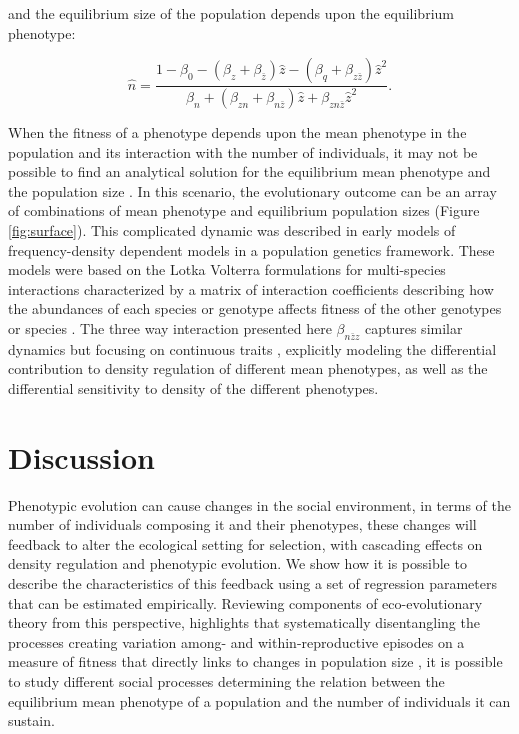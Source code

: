 \documentclass{article}
\begin{document}
\noindent and the equilibrium size of the population depends upon the equilibrium phenotype:

\begin{equation}  \label{eq: full}
	\hat{n} = \frac{1-\beta_{0}-(\beta_{z}  +  \beta_{\bar{z}})\hat{z} - (\beta_{q} + \beta_{z\bar{z}})\hat{z}^2 }{\beta_{n} + (\beta_{zn} + \beta_{n\bar{z}}) \hat{z} + \beta_{zn\bar{z}}\hat{z}^2}.
\end{equation}

When the fitness of a phenotype depends upon the mean phenotype in the population and its interaction with the number of individuals, it may not be possible to find an analytical solution for the equilibrium mean phenotype and the population size \citep{Engen2020}. In this scenario, the evolutionary outcome can be an array of combinations of mean phenotype and equilibrium population sizes (Figure \ref{fig:surface}). This complicated dynamic was described in early models of frequency-density dependent models in a population genetics framework. These models were based on the Lotka Volterra formulations for multi-species interactions characterized by a matrix of interaction coefficients describing how the abundances of each species or genotype affects fitness of the other genotypes or species \citep{Clarke1972, Anderson1983}. The three way interaction presented here $\beta_{n\bar{z}z}$ captures similar dynamics but focusing on continuous traits \citep{Engen2020}, explicitly modeling the differential contribution to density regulation of different mean phenotypes, as well as the differential sensitivity to density of the different phenotypes.   

\section{Discussion}
Phenotypic evolution can cause changes in the social environment, in terms of the number of individuals composing it and their phenotypes, these changes will feedback to alter the ecological setting for selection, with cascading effects on density regulation and phenotypic evolution. We show how it is possible to describe the characteristics of this feedback using a set of regression parameters that can be estimated empirically. Reviewing components of eco-evolutionary theory from this perspective, highlights that systematically disentangling the processes creating variation among- and within-reproductive episodes on a measure of fitness that directly links to changes in population size \citep{Saether2015}, it is possible to study different social processes determining the relation between the equilibrium mean phenotype of a population and the number of individuals it can sustain. 
\end{document}
